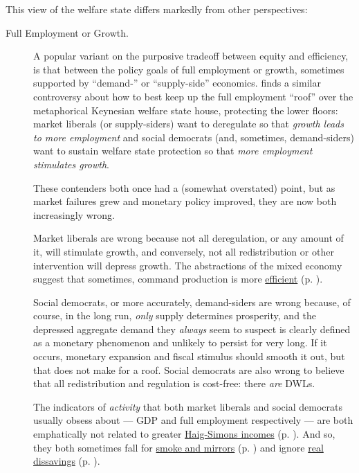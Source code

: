 This view of the welfare state differs markedly from other perspectives:
\begin{description}
	\item[Full Employment or Growth.] A popular variant on the purposive tradeoff between equity and efficiency, is that between the policy goals of full employment or growth, sometimes supported by ``demand-'' or ``supply-side'' economics. %
	\citeauthor{Offe2003} \citeyearpar[453]{Offe2003} finds a similar controversy about how to best keep up the full employment ``roof'' over the metaphorical Keynesian welfare state house, protecting the lower floors: market liberals (or supply-siders) want to deregulate so that \emph{growth leads to more employment} and social democrats (and, sometimes, demand-siders) want to sustain welfare state protection so that \emph{more employment stimulates growth}. 
	
	These contenders both once had a (somewhat overstated) point, but as market failures grew and monetary policy improved, they are now both increasingly wrong. 
	
	Market liberals are wrong because not all deregulation, or any amount of it, will stimulate growth, and conversely, not all redistribution or other intervention will depress growth. The abstractions of the mixed economy suggest that sometimes, command production is more \hyperref[sec:marketfailures]{efficient} (p. \pageref{sec:marketfailures}).
	
	Social democrats, or more accurately, demand-siders are wrong because, of course, in the long run, \emph{only} supply determines prosperity, and the depressed aggregate demand they \emph{always} seem to suspect is clearly defined as a monetary phenomenon and unlikely to persist for very long. If it occurs, monetary expansion and fiscal stimulus should smooth it out, but that does not make for a roof. Social democrats are also wrong to believe that all redistribution and regulation is cost-free: there \emph{are} \glspl{DWL}. 
	
	The indicators of \emph{activity} that both market liberals and social democrats usually obsess about --- \gls{GDP} and full employment respectively --- are both emphatically not related to greater \hyperref[sec:tradeoffs]{Haig-Simons incomes} (p. \pageref{sec:tradeoffs}). And so, they both sometimes fall for \hyperref[sec:smokenmirrors]{smoke and mirrors} (p. \pageref{sec:smokenmirrors}) and ignore \hyperref[sec:realdissavings]{real dissavings} (p. \pageref{sec:realdissavings}). %
	

\end{description}
